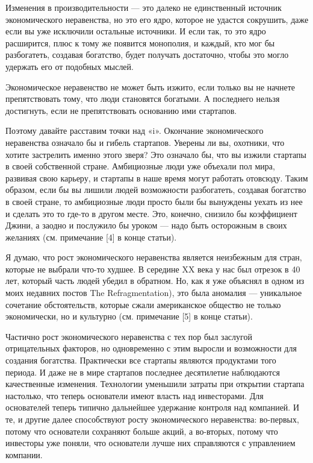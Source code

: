 \documentclass[ebook,12pt,oneside,openany]{memoir}
\begin{document}
Изменения в производительности — это далеко не единственный источник
экономического неравенства, но это его ядро, которое не удастся
сокрушить, даже если вы уже исключили остальные источники. И если так,
то это ядро расширится, плюс к тому же появится монополия, и каждый,
кто мог бы разбогатеть, создавая богатство, будет получать достаточно,
чтобы это могло удержать его от подобных мыслей.

Экономическое неравенство не может быть изжито, если только вы не
начнете препятствовать тому, что люди становятся богатыми. А
последнего нельзя достигнуть, если не препятствовать основанию ими
стартапов.

Поэтому давайте расставим точки над «i». Окончание экономического
неравенства означало бы и гибель стартапов. Уверены ли вы, охотники,
что хотите застрелить именно этого зверя? Это означало бы, что вы
изжили стартапы в своей собственной стране. Амбициозные люди уже
объехали пол мира, развивая свою карьеру, и стартапы в наше время
могут работать отовсюду. Таким образом, если бы вы лишили людей
возможности разбогатеть, создавая богатство в своей стране, то
амбициозные люди просто были бы вынуждены уехать из нее и сделать это
то где-то в другом месте. Это, конечно, снизило бы коэффициент Джини,
а заодно и послужило бы уроком — надо быть осторожным в своих желаниях
(см. примечание [4] в конце статьи).

Я думаю, что рост экономического неравенства является неизбежным для
стран, которые не выбрали что-то худшее. В середине XX века у нас был
отрезок в 40 лет, который часть людей убедил в обратном. Но, как я уже
объяснял в одном из моих недавних постов The Refragmentation), это
была аномалия — уникальное сочетание обстоятельств, которые сжали
американское общество не только экономически, но и культурно (см.
примечание [5] в конце статьи).

Частично рост экономического неравенства с тех пор был заслугой
отрицательных факторов, но одновременно с этим выросли и возможности
для создания богатства. Практически все стартапы являются продуктами
того периода. И даже не в мире стартапов последнее десятилетие
наблюдаются качественные изменения. Технологии уменьшили затраты при
открытии стартапа настолько, что теперь основатели имеют власть над
инвесторами. Для основателей теперь типично дальнейшее удержание
контроля над компанией. И те, и другие далее способствуют росту
экономического неравенства: во-первых, потому что основатели сохраняют
больше акций, а во-вторых, потому что инвесторы уже поняли, что
основатели лучше них справляются с управлением компании.
\end{document}
